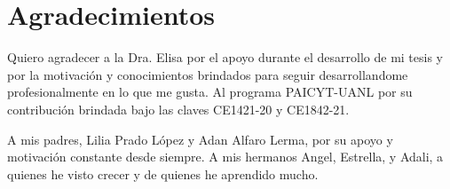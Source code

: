 
\chapter{Agradecimientos}

Quiero agradecer a la Dra. Elisa por el apoyo durante el desarrollo de mi tesis y por la motivación y conocimientos brindados para seguir desarrollandome profesionalmente en lo que me gusta. Al programa PAICYT-UANL por su contribución brindada bajo las claves CE1421-20 y CE1842-21. 

A mis padres, Lilia Prado López y Adan Alfaro Lerma, por su apoyo y motivación constante desde siempre. A mis hermanos Angel, Estrella, y Adali, a quienes he visto crecer y de quienes he aprendido mucho.
